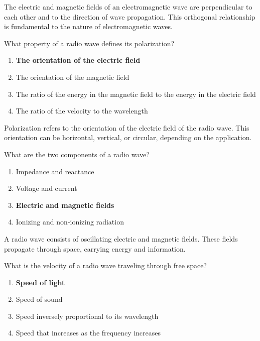 The electric and magnetic fields of an electromagnetic wave are perpendicular to each other and to the direction of wave propagation. This orthogonal relationship is fundamental to the nature of electromagnetic waves.

\begin{tcolorbox}[colback=gray!10!white,colframe=black!75!black,title={T3B02}]
What property of a radio wave defines its polarization?
\begin{enumerate}[label=\Alph*),noitemsep]
    \item \textbf{The orientation of the electric field}
    \item The orientation of the magnetic field
    \item The ratio of the energy in the magnetic field to the energy in the electric field
    \item The ratio of the velocity to the wavelength
\end{enumerate}
\end{tcolorbox}

Polarization refers to the orientation of the electric field of the radio wave. This orientation can be horizontal, vertical, or circular, depending on the application.

\begin{tcolorbox}[colback=gray!10!white,colframe=black!75!black,title={T3B03}]
What are the two components of a radio wave?
\begin{enumerate}[label=\Alph*),noitemsep]
    \item Impedance and reactance
    \item Voltage and current
    \item \textbf{Electric and magnetic fields}
    \item Ionizing and non-ionizing radiation
\end{enumerate}
\end{tcolorbox}

A radio wave consists of oscillating electric and magnetic fields. These fields propagate through space, carrying energy and information.

\begin{tcolorbox}[colback=gray!10!white,colframe=black!75!black,title={T3B04}]
What is the velocity of a radio wave traveling through free space?
\begin{enumerate}[label=\Alph*),noitemsep]
    \item \textbf{Speed of light}
    \item Speed of sound
    \item Speed inversely proportional to its wavelength
    \item Speed that increases as the frequency increases
\end{enumerate}
\end{tcolorbox}

